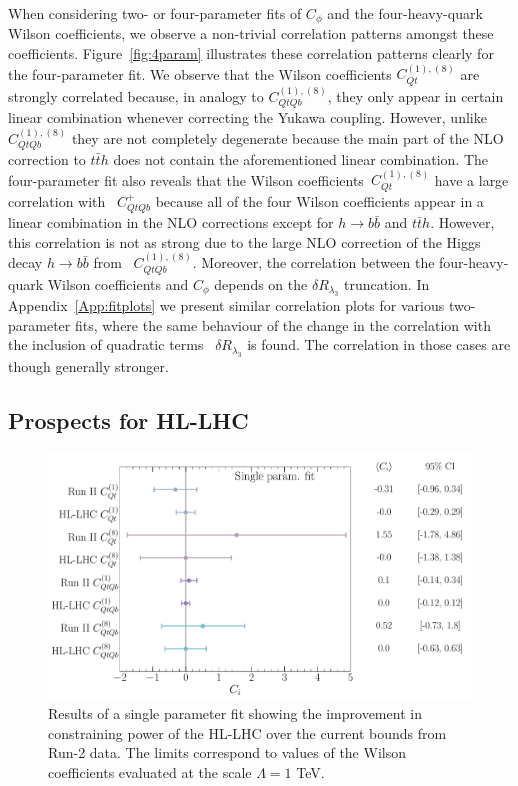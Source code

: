 %
When considering two- or four-parameter fits of $C_\phi$ and the four-heavy-quark Wilson coefficients, we observe a non-trivial correlation patterns amongst these coefficients.  Figure~\ref{fig:4param} illustrates these correlation patterns clearly for the four-parameter fit. 
We observe that the Wilson coefficients $C_{Qt}^{(1),(8) }$ are strongly correlated because, in analogy to $C_{QtQb}^{(1),(8) }$, they only appear in  certain linear combination whenever correcting the Yukawa coupling. However,  unlike $C_{QtQb}^{(1),(8) }$ they are not completely degenerate because the main part of the NLO correction to $t\bar t h$ does not contain the aforementioned linear combination.  The four-parameter fit also reveals that the Wilson coefficients~$C_{Qt}^{(1),(8) }$ have a large correlation with ~$C_{QtQb}^{+}$ because all of the four Wilson coefficients appear in a linear combination in the NLO corrections except for $ h\to b\bar b$ and $ t\bar{t} h$. However, this correlation is not as strong due to the large NLO correction of the Higgs decay $h \to b \bar b$ from ~$C_{QtQb}^{(1),(8) }$. Moreover, the correlation between the four-heavy-quark Wilson coefficients  and $C_{\phi}$ depends on the $\delta R_{\lambda_3}$ truncation. In Appendix~\ref{App:fitplots}  we present similar correlation plots for various two-parameter fits, where the same behaviour of the change in the correlation with the inclusion of quadratic terms ~$\delta R_{\lambda_3}$ is found. The correlation in those cases are though generally stronger.
\subsection{Prospects for HL-LHC}
\begin{figure}[t!]
	\begin{center}
		\includegraphics[width=0.75\linewidth]{fig/uebeblick_forest_ci}
	\end{center}
	\caption{ Results of a single parameter fit showing the improvement in constraining power of the HL-LHC over the current bounds from Run-2 data. The limits correspond to values of the Wilson coefficients evaluated at the scale $\Lambda=1$ TeV. \label{fig:HLLHC} }
\end{figure}

